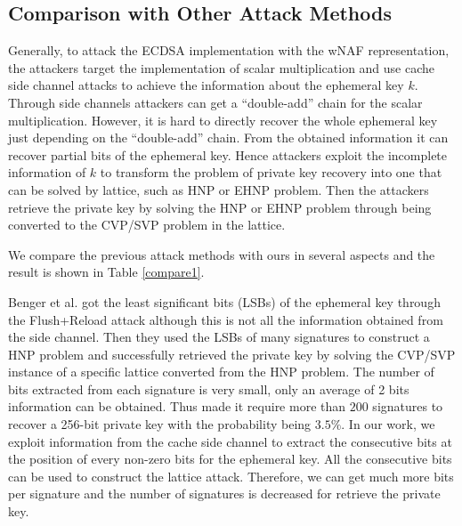 \subsection{Comparison with Other Attack Methods}
\label{compare}

 Generally,  to attack the ECDSA implementation with the wNAF representation,
   the attackers target the implementation of scalar multiplication
      and use cache side channel attacks to achieve the information about the ephemeral key $k$.
Through side channels attackers can get a ``double-add'' chain for the scalar multiplication.
However,
 it is hard to directly recover the whole ephemeral key just depending on the ``double-add'' chain.
From the obtained information it can recover partial bits of the ephemeral key.
Hence attackers exploit the incomplete information of $k$ to transform the problem of private key recovery into one that can be solved by lattice, such as HNP or EHNP problem.
 Then the attackers retrieve the private key by solving the HNP or EHNP problem through being converted to the CVP/SVP problem in the lattice.

We compare the previous attack methods with ours in several aspects and the result is shown in Table \ref{compare1}.

Benger et al. \cite{Benger2014} got the least significant bits (LSBs) of the ephemeral key through the Flush+Reload attack
although this is not all the information obtained from the side channel.
Then they used the LSBs of many signatures to construct a HNP problem and
successfully retrieved the private key by solving the CVP/SVP instance of a specific lattice converted from the HNP problem.
The number of bits extracted from each signature is very small, only an average of 2 bits information can be obtained.
Thus made it require more than $200$ signatures to recover a 256-bit private key with the probability being $3.5\%$.
In our work, we exploit information from the cache side channel to extract the consecutive bits at the position of every non-zero bits for the ephemeral key.
All the consecutive bits can be used to construct the lattice attack.
Therefore, we can get much more bits per signature and the number of signatures is decreased for retrieve the private key.

